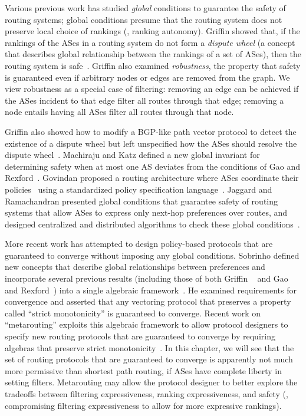 Various previous work has studied {\em global} conditions to guarantee
the safety of routing systems; global conditions presume that the
routing system does not preserve local choice of rankings (\ie, ranking
autonomy).  Griffin \ea showed that, if the rankings of the ASes in
a routing system do not form a \emph{dispute wheel} (a concept that
describes global relationship between the rankings of a set of ASes),
then the routing system is safe~\cite{Griffin2002c}.  Griffin \ea also
examined {\em robustness}, the property that safety is guaranteed even
if arbitrary nodes or edges are removed from the graph.  We view
robustness as a special case of filtering: removing an edge can be
achieved if the ASes incident to that edge filter all routes through
that edge; removing a node entails having all ASes filter all routes
through that node.

Griffin \ea also showed how to modify a BGP-like path vector protocol to
detect the existence of a dispute wheel but left unspecified how the
ASes should resolve the dispute wheel~\cite{Griffin2000}.  Machiraju and
Katz defined a new global invariant for determining safety when at most
one AS deviates from the conditions of Gao and
Rexford~\cite{Machiraju2004}.  Govindan \ea proposed a routing
architecture where ASes coordinate their policies~\cite{Govindan1999,
Govindan1998} using a standardized policy specification
language~\cite{rfc2622}.  Jaggard and Ramachandran presented
global conditions that guarantee safety of routing systems that allow
ASes to express only next-hop preferences over routes, and designed
centralized and distributed algorithms to check these global
conditions~\cite{Jaggard2004}.  

More recent work has attempted to design policy-based protocols that are
guaranteed to converge without imposing any global conditions.  Sobrinho
defined new concepts that describe global relationships between
preferences and incorporate several previous results (including those
of both Griffin \eans~\cite{Griffin2002c} and Gao and
Rexford~\cite{Gao2001a}) into a single algebraic
framework~\cite{Sobrinho2003}.  He examined requirements for
convergence and asserted that any vectoring protocol that preserves a
property called ``strict monotonicity'' is guaranteed to converge.
Recent work on ``metarouting'' exploits this algebraic framework to
allow protocol designers to specify new routing protocols that are
guaranteed to converge by requiring algebras that preserve strict
monotonicity~\cite{Griffin2005}.  In this chapter, we will
see that the set of routing protocols that are guaranteed to converge is
apparently not much more permissive than shortest path routing, if ASes
have complete liberty in setting filters.  Metarouting may allow the
protocol designer to better explore the tradeoffs between filtering
expressiveness, ranking expressiveness, and safety (\ie, compromising
filtering expressiveness to allow for more expressive rankings).

